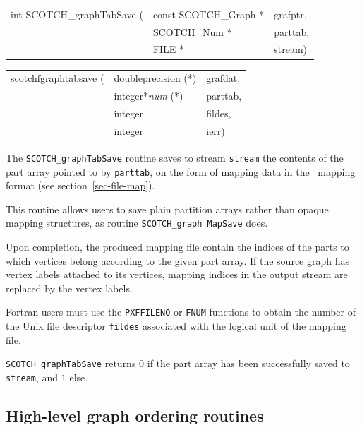 \begin{itemize}
\progsyn

{\tt\begin{tabular}{l@{}ll}
int SCOTCH\_graphTabSave ( & const SCOTCH\_Graph * & grafptr, \\
                           & SCOTCH\_Num *         & parttab, \\
                           & FILE *                & stream)
\end{tabular}}

{\tt\begin{tabular}{l@{}ll}
scotchfgraphtabsave ( & doubleprecision (*)   & grafdat, \\
                      & integer*{\it num} (*) & parttab, \\
                      & integer               & fildes, \\
                      & integer               & ierr)
\end{tabular}}

\progdes

The {\tt SCOTCH\_graphTabSave} routine saves to stream {\tt stream}
the contents of the part array pointed to by \texttt{parttab}, on the
form of mapping data in the \scotch\ mapping format (see
section~\ref{sec-file-map}).

This routine allows users to save plain partition arrays rather than
opaque mapping structures, as routine \texttt{SCOTCH\_\lbt graph\lbt
Map\lbt Save} does.

Upon completion, the produced mapping file contain the indices of the
parts to which vertices belong according to the given part array. If
the source graph has vertex labels attached to its vertices, mapping
indices in the output stream are replaced by the vertex labels.

Fortran users must use the {\tt PXFFILENO} or {\tt FNUM} functions to
obtain the number of the Unix file descriptor {\tt fildes} associated
with the logical unit of the mapping file.

\progret

{\tt SCOTCH\_graphTabSave} returns $0$ if the part array 
has been successfully saved to  \texttt{stream}, and $1$ else.
\end{itemize}

\subsection{High-level graph ordering routines}

